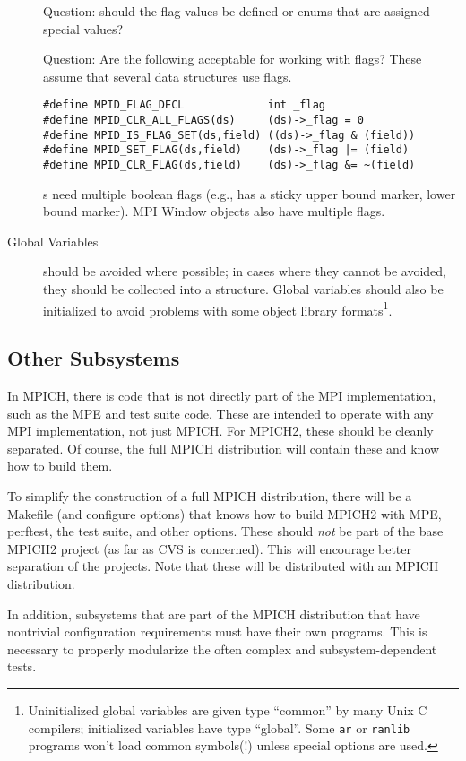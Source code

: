 \documentclass{article}
\begin{document}
\begin{description}
Question: should the flag values be defined or enums that are assigned
special values?

Question: Are the following acceptable for working with flags?  These
assume that several data structures use flags.
\begin{verbatim}
#define MPID_FLAG_DECL             int _flag
#define MPID_CLR_ALL_FLAGS(ds)     (ds)->_flag = 0
#define MPID_IS_FLAG_SET(ds,field) ((ds)->_flag & (field))
#define MPID_SET_FLAG(ds,field)    (ds)->_flag |= (field)
#define MPID_CLR_FLAG(ds,field)    (ds)->_flag &= ~(field)
\end{verbatim}
s need multiple boolean flags (e.g., has a
sticky upper bound marker, lower bound marker).  MPI Window objects also
have multiple flags.

\item[Global Variables]should be avoided where possible; in cases
where they cannot be avoided, they should be collected into a
structure.
Global variables should also be initialized to avoid problems with
some object library formats\footnote{Uninitialized global variables
are given type ``common'' by many Unix C compilers; initialized
variables have type ``global''.  Some \texttt{ar} or \texttt{ranlib}
programs won't load common symbols(!) unless special options are used.}.
\end{description}

\subsection{Other Subsystems}
In MPICH, there is code that is not directly part of the MPI
implementation, such as the MPE and test suite code.  These are intended to
operate with any MPI implementation, not just MPICH.
For MPICH2, these should be cleanly separated.  Of course, the full MPICH
distribution will contain these and know how to build them.

To simplify the construction of a
full MPICH distribution, there will be a Makefile (and configure
options) that knows how to build MPICH2 with MPE, perftest, the test
suite, and other options.  These should \emph{not} be part of the base
MPICH2 project (as far as CVS is concerned).  This will encourage
better separation of the projects.  Note that these will be distributed with
an MPICH distribution.  

In addition, subsystems that are part of the MPICH distribution that have
nontrivial configuration requirements must have their own 
programs.  This is necessary to properly modularize the often complex and
subsystem-dependent tests.
\end{document}
